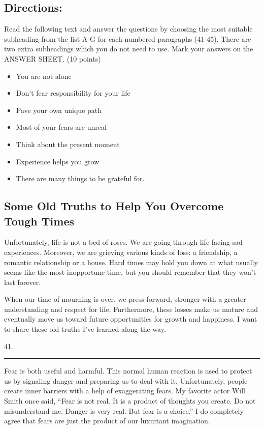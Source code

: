 \documentclass[UTF8,11pt]{ctexart}
\begin{document}
\subsection*{\textbf{Directions:}}


Read the following text and answer the questions by choosing the most suitable subheading from the list A-G for each numbered paragraphs (41-45). There are two extra subheadings which you do not need to use. Mark your answers on the ANSWER SHEET. (10 points)


\begin{itemize}[leftmargin=2em,itemsep=.2em,topsep=.4em]\item[A.] You are not alone
\item[B.] Don’t fear responsibility for your life
\item[C.] Pave your own unique path
\item[D.] Most of your fears are unreal
\item[E.] Think about the present moment
\item[F.] Experience helps you grow
\item[G.] There are many things to be grateful for.
\end{itemize}

\subsection*{\textbf{Some Old Truths to Help You Overcome Tough Times}}


Unfortunately, life is not a bed of roses. We are going through life facing sad experiences. Moreover, we are grieving various kinds of loss: a friendship, a romantic relationship or a house. Hard times may hold you down at what usually seems like the most inopportune time, but you should remember that they won’t last forever.


When our time of mourning is over, we press forward, stronger with a greater understanding and respect for life. Furthermore, these losses make us mature and eventually move us toward future opportunities for growth and happiness. I want to share these old truths I’ve learned along the way.


41. \par\noindent\rule{.95\linewidth}{.4pt}\par


Fear is both useful and harmful. This normal human reaction is used to protect us by signaling danger and preparing us to deal with it. Unfortunately, people create inner barriers with a help of exaggerating fears. My favorite actor Will Smith once said, “Fear is not real. It is a product of thoughts you create. Do not misunderstand me. Danger is very real. But fear is a choice.” I do completely agree that fears are just the product of our luxuriant imagination.
\end{document}
